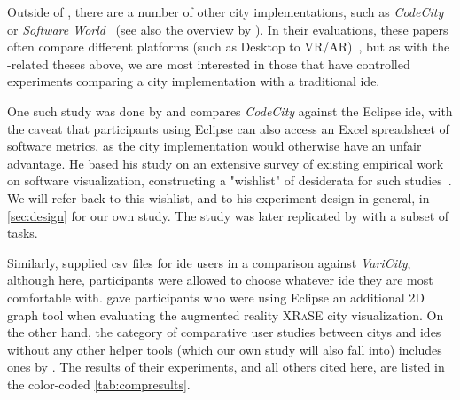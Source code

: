 \documentclass[../thesis]{subfiles}
\begin{document}
Outside of \SEE{}, there are a number of other \gls{city} implementations, such as \emph{CodeCity}~\cite{wettel2007} or \emph{Software World}~\cite{knight2000} (see also the overview by \textcite{jeffery2019}).
In their evaluations, these papers often compare different platforms (such as Desktop to VR/AR)~\cite[\eg,][]{merino2017,fittkau2015, merino2018}, but as with the \SEE{}-related theses above, we are most interested in those that have controlled experiments comparing a \gls{city} implementation with a traditional \gls{ide}.

One such study was done by \textcite{wettel2011} and compares \emph{CodeCity} against the Eclipse \gls{ide}, with the caveat that participants using Eclipse can also access an Excel spreadsheet of software metrics, as the \gls{city} implementation would otherwise have an unfair advantage.
He based his study on an extensive survey of existing empirical work on software visualization, constructing a "wishlist" of desiderata for such studies~\cite[chapter 7]{wettel2011}.
We will refer back to this wishlist, and to his experiment design in general, in \cref{sec:design} for our own study.
The study was later replicated by \textcite{romano2019} with a subset of tasks.

Similarly, \textcite{mortara2024} supplied \gls{csv} files for \gls{ide} users in a comparison against \emph{VariCity}, although here, participants were allowed to choose whatever \gls{ide} they are most comfortable with.
\textcite{mehra2020} gave participants who were using Eclipse an additional 2D graph tool when evaluating the augmented reality \textsc{XRaSE} \gls{city} visualization.
On the other hand, the category of comparative user studies between \glspl{city} and \glspl{ide} without any other helper tools (which our own study will also fall into) includes ones by \textcite{khaloo2017,rohlfing2024,lennartkipka2020}.
The results of their experiments, and all others cited here, are listed in the color-coded \cref{tab:compresults}.



\newcommand{\reside}[1]{\cellcolor{Blue}\textcolor{White}{#1}}
\newcommand{\rescc}[1]{\cellcolor{Maroon}\textcolor{White}{#1}}
\newcommand{\residel}[1]{\cellcolor{LightBlue}#1}  %
\newcommand{\resccl}[1]{\cellcolor{LightMaroon}#1}
\newcommand{\resmixed}[1]{\cellcolor{Goldenrod}#1}  %
\newcommand{\resnone}[1]{\cellcolor{Gray!70!white}No diff.}  %
\newcommand{\resna}[1]{\textcolor{Gray}{\textit{N/A}}}
\end{document}
